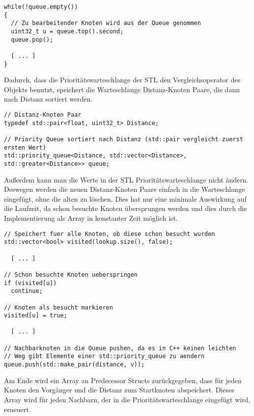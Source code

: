 \documentclass[a4paper,10pt,ngerman]{scrartcl}
\begin{document}
\begin{lstlisting}[frame=single]
while(!queue.empty())
{
  // Zu bearbeitender Knoten wird aus der Queue genommen
  uint32_t u = queue.top().second;
  queue.pop();

  [ ... ]
}
\end{lstlisting}

Dadurch, dass die Prioritätswarteschlange der STL den Vergleichsoperator des Objekts benutzt,
speichert die Warteschlange Distanz-Knoten Paare, die dann nach Distanz sortiert werden.

\begin{lstlisting}[frame=single]
// Distanz-Knoten Paar
typedef std::pair<float, uint32_t> Distance;

// Priority Queue sortiert nach Distanz (std::pair vergleicht zuerst ersten Wert)
std::priority_queue<Distance, std::vector<Distance>, std::greater<Distance>> queue;
\end{lstlisting}

Außerdem kann man die Werte in der STL Prioritätswarteschlange nicht ändern. Deswegen werden die neuen Distanz-Knoten Paare einfach in die Warteschlange eingefügt,
ohne die alten zu löschen. Dies hat nur eine minimale Auswirkung auf die Laufzeit, da schon besuchte Knoten übersprungen werden und dies durch die Implementierung
als Array in konstanter Zeit möglich ist.

\begin{lstlisting}[frame=single]
// Speichert fuer alle Knoten, ob diese schon besucht wurden
std::vector<bool> visited(lookup.size(), false);

  [ ... ]

// Schon besuchte Knoten ueberspringen
if (visited[u])
  continue;

// Knoten als besucht markieren
visited[u] = true;

  [ ... ]

// Nachbarknoten in die Queue pushen, da es in C++ keinen leichten
// Weg gibt Elemente einer std::priority_queue zu aendern
queue.push(std::make_pair(distance, v));
\end{lstlisting}

Am Ende wird ein Array an Predecessor Structs zurückgegeben, dass für jeden Knoten den Vorgänger und die Distanz zum Startknoten abspeichert.
Dieses Array wird für jeden Nachbarn, der in die Prioritätswarteschlange eingefügt wird, erneuert.
\end{document}
